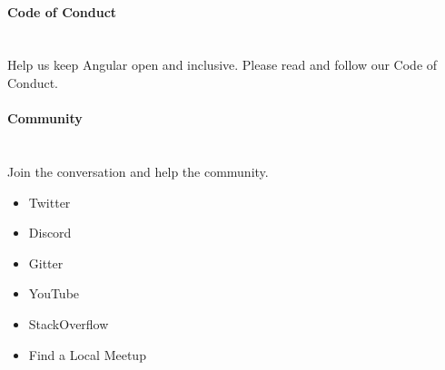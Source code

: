 \documentclass{article}
\begin{document}
\\
{\noindent \Large \textbf{Code of Conduct}}\\\\
\\
Help us keep Angular open and inclusive. Please read and follow our Code of Conduct.\\
\\
{\noindent \LARGE \textbf{Community}}\\\\
\\
Join the conversation and help the community.\\
\begin{itemize}
	\item Twitter
	\item Discord
	\item Gitter
	\item YouTube
	\item StackOverflow
	\item Find a Local Meetup
\end{itemize}
\end{document}
